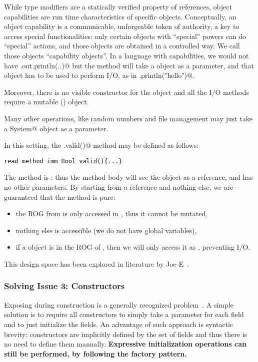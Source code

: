 While type modifiers are a statically verified property of references, object capabilities are run time characteristics of specific objects.
Conceptually, an object capability is a communicable, unforgeable token of authority, a key to access special functionalities: only certain objects with ``special'' powers can do ``special'' actions, and those objects are obtained in a controlled way.
We call those objects ``capability objects''.
In a language with capabilities, we would not have \Q@System.out.println(..)@ but the \Q@main@ method will take a \Q@System@ object as a parameter, and that object has to be used to perform I/O, as in \Q@mySystem.println("hello")@.

Moreover, there is no visible constructor for the \Q@System@ object and all the I/O methods require a mutable (\Q@mut@) object.

Many other operations, like random numbers and file management may just take a \Q@mut System@ object as a parameter.

In this setting, the \Q@.valid()@ method may be defined as follows:
\saveSpace
\begin{lstlisting}
read method imm Bool valid(){...}
\end{lstlisting}
\saveSpace
The method is \Q@read@: thus the method body will see the \Q@this@ object as a \Q@read@ reference, and has no other parameters.
By starting from a \Q@read@ reference and nothing else, we are guaranteed that the method is pure:
\begin{itemize}
\item the ROG from \Q@this@ is only accessed in \Q@read@, thus it cannot be mutated,
\item nothing else is accessible (we do not have global variables),
\item if a \Q@System@ object is in the ROG of \Q@this@, then we will only access it as \Q@read@, preventing I/O.
\end{itemize}
\noindent This design space has been explored in literature by Joe-E~\cite{finifter2008verifiable}.
\saveSpace

\subsubsection*{Solving Issue 3: Constructors}
\saveSpace
Exposing \Q@this@ during construction is a generally recognized problem~\cite{gil2009we}.
A simple solution is to require all constructors to 
simply take a parameter for each field and to just initialize the fields.
An advantage of such approach is syntactic brevity: constructors are implicitly defined
by the set of fields and thus there is no need to define them manually.
\textbf{Expressive initialization operations can still be performed, by following the factory pattern.}
\saveSpace
